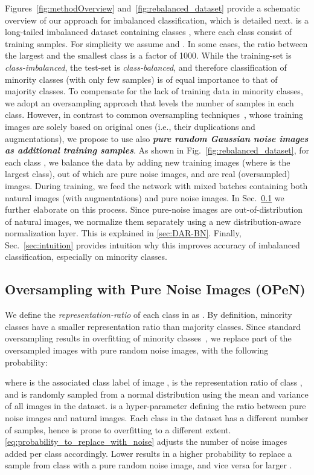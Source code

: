 \documentclass[nohyperref]{article}
\theoremstyle{plain}
\theoremstyle{definition}
\theoremstyle{remark}
\begin{document}
Figures~\ref{fig:methodOverview} and~\ref{fig:rebalanced_dataset} provide a schematic overview of our approach for imbalanced  classification, which is detailed next.
 is a long-tailed imbalanced dataset containing  classes , where each class  consist of  training samples. For simplicity we assume  and . In some cases, the ratio between the largest and the smallest class is a factor of 1000. While the training-set   is \textit{class-imbalanced}, the test-set is \textit{class-balanced}, and therefore classification of minority classes (with only few samples) is of equal importance to that of majority classes. To compensate for the lack of training data in minority classes, we adopt an oversampling approach that levels the number of samples in each class. However, in contrast to common oversampling techniques~\cite{chawla2002smote, kim2020m2m}, whose training images are solely based on original ones (i.e., their duplications and augmentations), we propose to use also \emph{\textbf{pure random Gaussian noise images as additional training samples}}. As shown in Fig.~\ref{fig:rebalanced_dataset}, for each class , we balance the data by adding  new training images (where  is the largest class), out of which  are pure noise images, and  are real (oversampled) images. 
During training, we feed the network with mixed batches containing both natural images (with augmentations) and pure noise images. In Sec.~\ref{sec:OPeN} we further elaborate on this process.
Since pure-noise images are out-of-distribution of natural images, we normalize them separately using a new distribution-aware normalization layer. This is explained in \cref{sec:DAR-BN}. Finally,  Sec.~\ref{sec:intuition}  provides intuition why this improves accuracy of imbalanced classification, especially on minority classes.

\subsection{Oversampling with Pure Noise Images (OPeN)}\label{sec:OPeN}

We define the \emph{representation-ratio} of each class  in  as .
By definition, minority classes have a smaller representation ratio than majority classes. 
Since standard oversampling results in overfitting of minority classes~\cite{buda2018systematic}, we replace part of the oversampled images with pure random noise images, with the following probability:
\vspace*{-0.2cm}

where  is the associated class label of image ,  is the representation ratio of class , and  is randomly sampled from a normal distribution using the mean and variance of all images in the dataset.  is a hyper-parameter defining the ratio between pure noise images and natural images. 
Each class in the dataset has a different number of samples, hence is prone to overfitting to a different extent. 
\cref{eq:probability_to_replace_with_noise} adjusts the number of noise images added per class accordingly. 
Lower  results in a higher probability to replace a sample from class  with a pure random noise image, and vice versa for larger .
\end{document}

